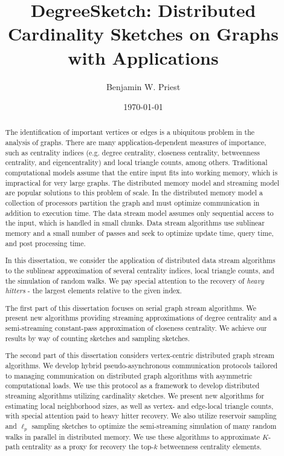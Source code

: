 \documentclass[10]{article}
\title{Degree{S}ketch: Distributed Cardinality Sketches on Graphs with Applications}
\author{Benjamin W. Priest}
\date{\today} %
\begin{document}
\maketitle

\begin{abstract}
The identification of important vertices or edges is a ubiquitous problem in the analysis of graphs.
There are many application-dependent measures of importance, such as centrality indices (e.g. degree centrality, closeness centrality, betweenness centrality, and eigencentrality) and local triangle counts, among others.
Traditional computational models assume that the entire input fits into working memory, which is impractical for very large graphs.
The distributed memory model and streaming model are popular solutions to this problem of scale.
In the distributed memory model a collection of processors partition the graph and must optimize communication in addition to execution time.
The data stream model assumes only sequential access to the input, which is handled in small chunks.
Data stream algorithms use sublinear memory and a small number of passes and seek to optimize update time, query time, and post processing time.  

In this dissertation, we consider the application of distributed data stream algorithms to the sublinear approximation of several centrality indices, local triangle counts, and the simulation of random walks. 
We pay special attention to the recovery of \emph{heavy hitters} - the largest elements relative to the given index.

The first part of this dissertation focuses on serial graph stream algorithms.
We present new algorithms providing streaming approximations of degree centrality and a semi-streaming constant-pass approximation of closeness centrality.
We achieve our results by way of counting sketches and sampling sketches.

The second part of this dissertation considers vertex-centric distributed graph stream algorithms.
We develop hybrid pseudo-asynchronous communication protocols tailored to managing communication on distributed graph algorithms with asymmetric computational loads.
We use this protocol as a framework to develop distributed streaming algorithms utilizing cardinality sketches.
We present new algorithms for estimating local neighborhood sizes, as well as vertex- and edge-local triangle counts, with special attention paid to heavy hitter recovery.
We also utilize reservoir sampling and $\ell_p$ sampling sketches to optimize the semi-streaming simulation of many random walks in parallel in distributed memory.
We use these algorithms to approximate  $K$-path centrality as a proxy for recovery the top-$k$ betweenness centrality elements.
\end{abstract}
\end{document}

